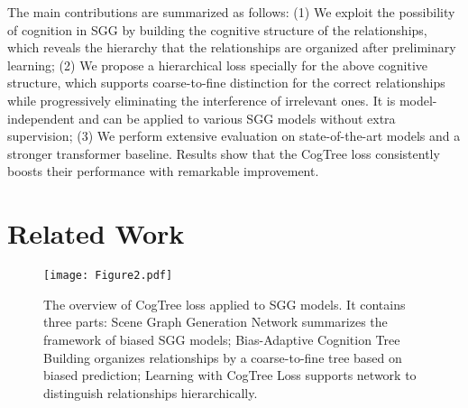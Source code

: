 \documentclass[letterpaper]{article} \usepackage{aaai21}  \usepackage{times}  \usepackage{helvet} \usepackage{courier}  \usepackage[hyphens]{url}  \usepackage{graphicx} \urlstyle{rm} \def\UrlFont{\rm}  \usepackage{natbib}  \usepackage{caption} \frenchspacing  \setlength{\pdfpagewidth}{8.5in}  \setlength{\pdfpageheight}{11in}  \usepackage{amsmath,amsthm}
\begin{document}
The main contributions are summarized as follows: (1) We exploit the possibility of cognition in SGG by building the cognitive structure of the relationships, which reveals the hierarchy that the relationships are organized after preliminary learning; 
(2) We propose a hierarchical loss specially for the above cognitive structure,  which supports coarse-to-fine distinction for the correct relationships while progressively eliminating the interference of irrelevant ones. It is model-independent and  can be applied to various SGG models without extra supervision; (3) We perform extensive evaluation on state-of-the-art models and a stronger transformer baseline. Results show that the CogTree loss consistently boosts their performance with remarkable improvement. 











\section{Related Work}
\label{sec:relatedWork}
\begin{figure*}[ht]
    \centering
    \texttt{[image: Figure2.pdf]}
    \caption{The overview of CogTree loss applied to SGG models. It contains three parts: Scene Graph Generation Network summarizes the framework of biased SGG models; Bias-Adaptive Cognition Tree Building organizes relationships by a coarse-to-fine tree based on biased prediction; Learning with CogTree Loss supports network to distinguish relationships hierarchically. }
    \label{fig:framwork}
\end{figure*}
\end{document}
